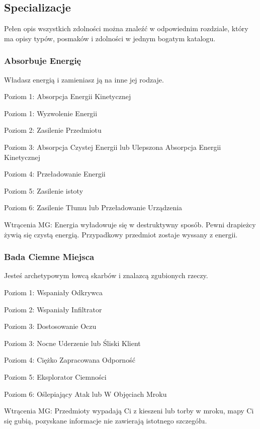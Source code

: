 \subsection{Specializacje}

Pełen opis wszystkich zdolności można znaleźć w odpowiednim rozdziale, który ma opisy typów, posmaków i zdolności w jednym bogatym katalogu.

\subsubsection{Absorbuje Energię}

Władasz energią i zamieniasz ją na inne jej rodzaje.

Poziom 1: Absorpcja Energii Kinetycznej

Poziom 1: Wyzwolenie Energii

Poziom 2: Zasilenie Przedmiotu

Poziom 3: Absorpcja Czystej Energii lub Ulepszona Absorpcja Energii Kinetycznej

Poziom 4: Przeładowanie Energii

Poziom 5: Zasilenie istoty

Poziom 6: Zasilenie Tłumu lub Przeładowanie Urządzenia

Wtrącenia MG: Energia wyładowuje się w destruktywny sposób. Pewni drapieżcy żywią się czystą energią. Przypadkowy przedmiot zostaje wyssany z energii.

\subsubsection{Bada Ciemne Miejsca}

Jesteś archetypowym łowcą skarbów i znalazcą zgubionych rzeczy.

Poziom 1: Wspaniały Odkrywca

Poziom 2: Wspaniały Infiltrator

Poziom 3: Dostosowanie Oczu

Poziom 3: Nocne Uderzenie lub Śliski Klient

Poziom 4: Ciężko Zapracowana Odporność

Poziom 5: Eksplorator Ciemności

Poziom 6: Oślepiający Atak lub W Objęciach Mroku

Wtrącenia MG: Przedmioty wypadają Ci z kieszeni lub torby w mroku, mapy Ci się gubią, pozyskane informacje nie zawierają istotnego szczegółu.  

